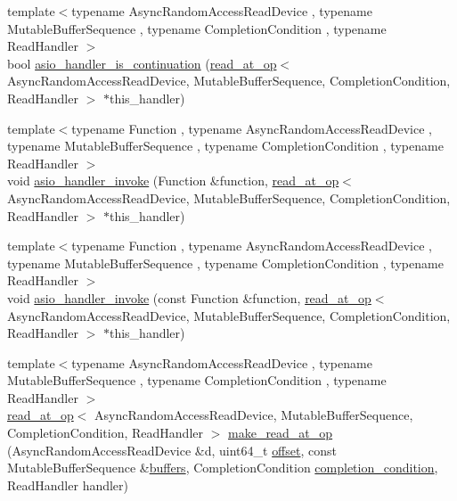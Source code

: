 \begin{DoxyCompactItemize}
\item 
{\footnotesize template$<$typename Async\+Random\+Access\+Read\+Device , typename Mutable\+Buffer\+Sequence , typename Completion\+Condition , typename Read\+Handler $>$ }\\bool \hyperlink{namespaceasio_1_1detail_a30be72b3a0e7c9d9165c3544f8099e01}{asio\+\_\+handler\+\_\+is\+\_\+continuation} (\hyperlink{classasio_1_1detail_1_1read__at__op}{read\+\_\+at\+\_\+op}$<$ Async\+Random\+Access\+Read\+Device, Mutable\+Buffer\+Sequence, Completion\+Condition, Read\+Handler $>$ $\ast$this\+\_\+handler)
\item 
{\footnotesize template$<$typename Function , typename Async\+Random\+Access\+Read\+Device , typename Mutable\+Buffer\+Sequence , typename Completion\+Condition , typename Read\+Handler $>$ }\\void \hyperlink{namespaceasio_1_1detail_a0aee64f456df840bc7978cc30be29d6f}{asio\+\_\+handler\+\_\+invoke} (Function \&function, \hyperlink{classasio_1_1detail_1_1read__at__op}{read\+\_\+at\+\_\+op}$<$ Async\+Random\+Access\+Read\+Device, Mutable\+Buffer\+Sequence, Completion\+Condition, Read\+Handler $>$ $\ast$this\+\_\+handler)
\item 
{\footnotesize template$<$typename Function , typename Async\+Random\+Access\+Read\+Device , typename Mutable\+Buffer\+Sequence , typename Completion\+Condition , typename Read\+Handler $>$ }\\void \hyperlink{namespaceasio_1_1detail_a023c6fadfeb73b0f242ca1e194fd8e49}{asio\+\_\+handler\+\_\+invoke} (const Function \&function, \hyperlink{classasio_1_1detail_1_1read__at__op}{read\+\_\+at\+\_\+op}$<$ Async\+Random\+Access\+Read\+Device, Mutable\+Buffer\+Sequence, Completion\+Condition, Read\+Handler $>$ $\ast$this\+\_\+handler)
\item 
{\footnotesize template$<$typename Async\+Random\+Access\+Read\+Device , typename Mutable\+Buffer\+Sequence , typename Completion\+Condition , typename Read\+Handler $>$ }\\\hyperlink{classasio_1_1detail_1_1read__at__op}{read\+\_\+at\+\_\+op}$<$ Async\+Random\+Access\+Read\+Device, Mutable\+Buffer\+Sequence, Completion\+Condition, Read\+Handler $>$ \hyperlink{namespaceasio_1_1detail_aa325458805819187338b4c493e1cb26f}{make\+\_\+read\+\_\+at\+\_\+op} (Async\+Random\+Access\+Read\+Device \&d, uint64\+\_\+t \hyperlink{group__async__read__at_ga8dcdb41a4adfd6fe5322b5dd666d9f29}{offset}, const Mutable\+Buffer\+Sequence \&\hyperlink{group__async__read_ga54dede45c3175148a77fe6635222c47d}{buffers}, Completion\+Condition \hyperlink{group__async__read_gae2e215d5013596cc2b385bb6c13fa518}{completion\+\_\+condition}, Read\+Handler handler)

\end{DoxyCompactItemize}
